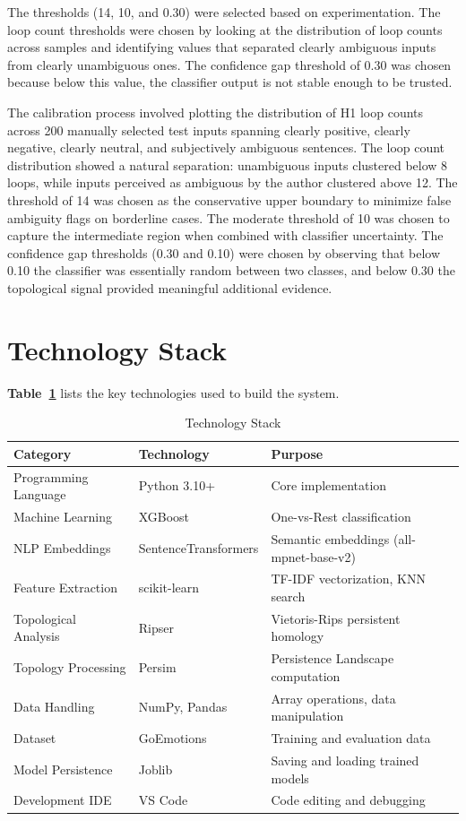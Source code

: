 The thresholds (14, 10, and 0.30) were selected based on experimentation. The loop count
thresholds were chosen by looking at the distribution of loop counts across samples and
identifying values that separated clearly ambiguous inputs from clearly unambiguous ones. The
confidence gap threshold of 0.30 was chosen because below this value, the classifier output is
not stable enough to be trusted.

The calibration process involved plotting the distribution of H1 loop counts across 200 manually selected test inputs spanning clearly positive, clearly negative, clearly neutral, and subjectively ambiguous sentences. The loop count distribution showed a natural separation: unambiguous inputs clustered below 8 loops, while inputs perceived as ambiguous by the author clustered above 12. The threshold of 14 was chosen as the conservative upper boundary to minimize false ambiguity flags on borderline cases. The moderate threshold of 10 was chosen to capture the intermediate region when combined with classifier uncertainty. The confidence gap thresholds (0.30 and 0.10) were chosen by observing that below 0.10 the classifier was essentially random between two classes, and below 0.30 the topological signal provided meaningful additional evidence.

\section{Technology Stack}

\textbf{Table~\ref{tab:techstack}} lists the key technologies used to build the system.

\begin{table}[H]
\centering
\caption{Technology Stack}
\label{tab:techstack}
\begin{tabular}{lll}
\toprule
\textbf{Category} & \textbf{Technology} & \textbf{Purpose} \\
\midrule
Programming Language & Python 3.10+        & Core implementation \\
Machine Learning     & XGBoost             & One-vs-Rest classification \\
NLP Embeddings       & SentenceTransformers & Semantic embeddings (all-mpnet-base-v2) \\
Feature Extraction   & scikit-learn        & TF-IDF vectorization, KNN search \\
Topological Analysis & Ripser              & Vietoris-Rips persistent homology \\
Topology Processing  & Persim              & Persistence Landscape computation \\
Data Handling        & NumPy, Pandas       & Array operations, data manipulation \\
Dataset              & GoEmotions          & Training and evaluation data \\
Model Persistence    & Joblib              & Saving and loading trained models \\
Development IDE      & VS Code             & Code editing and debugging \\
\bottomrule
\end{tabular}
\end{table}


